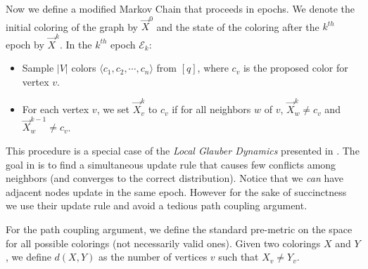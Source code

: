 Now we define a modified Markov Chain that proceeds in epochs.
We denote the initial coloring of the graph by $\vec X^0$ and the state of the coloring after the $k^{th}$ epoch by $\vec X^k$.
In the $k^{th}$ epoch $\mathcal E_k$:
\begin{itemize}
    \item Sample $|V|$ colors $ \langle c_1, c_2,\cdots, c_n \rangle$ from $[q]$, where $c_v$ is the proposed color for vertex $v$.
    \item For each vertex $v$, we set $\vec X^k_v$ to $c_v$ if for all neighbors $w$ of $v$, $\vec X^k_w\not=c_v$ and $\vec X^{k-1}_w\not=c_v$.
\end{itemize}

This procedure is a special case of the \emph{Local Glauber Dynamics} presented in \cite{mohsen}.
The goal in \cite{mohsen} is to find a simultaneous update rule that causes few conflicts among neighbors (and converges to the correct distribution).
Notice that we \emph{can} have adjacent nodes update in the same epoch.
However for the sake of succinctness we use their update rule and avoid a tedious path coupling argument.

For the path coupling argument, we define the standard pre-metric on the space for all possible colorings (not necessarily valid ones).
Given two colorings $X$ and $Y$, we define $d(X,Y)$ as the number of vertices $v$ such that $X_v\not= Y_v$.

